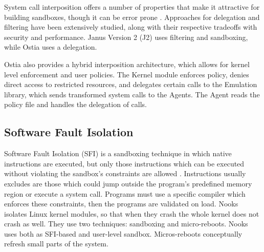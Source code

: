 System call interposition offers a number of properties that make it attractive for building sandboxes, 
though it can be error prone \cite{SCI:04}. Approaches for delegation and filtering have been extensively studied, 
along with their respective tradeoffs with security and performance. Janus Version 2 (J2) \cite{Janus0:96, Janus:99} 
uses filtering and sandboxing, while Ostia \cite{SCI:04} uses a delegation.

Ostia also provides a hybrid interposition architecture, which allows for kernel level enforcement and user policies. 
The Kernel module enforces policy, denies direct access to restricted resources, and delegates certain calls to 
the Emulation library, which sends transformed system calls to the Agents. The Agent reads the policy file and 
handles the delegation of calls.


\subsection{Software Fault Isolation}

Software Fault Isolation (SFI) is a sandboxing technique in which native instructions are executed, but only those instructions 
which can be executed without violating the sandbox's constraints are allowed \cite{SFI:93}. Instructions usually excludes 
are those which could jump outside the program's predefined memory region or execute a system call. 
Programs must use a specific compiler which enforces these constraints, then the programs are validated on load. 
Nooks \cite{Nooks:03} isolates Linux kernel modules, so that when they crash the whole kernel does not crash as well. 
They use two techniques: sandboxing and micro-reboots. Nooks uses both as SFI-based and user-level sandbox. 
Micros-reboots conceptually refresh small parts of the system.